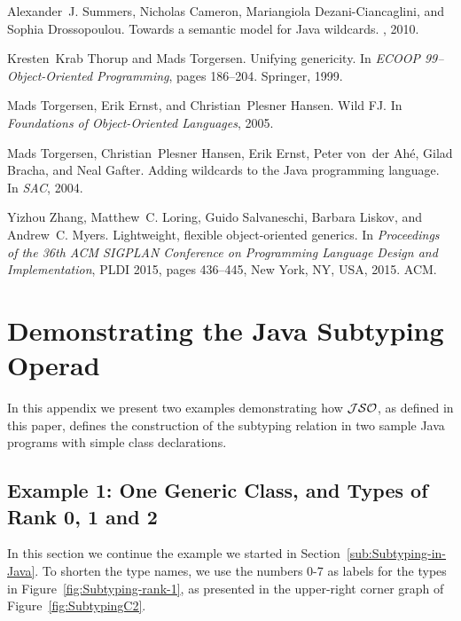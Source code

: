 \documentclass[twocolumn,english]{article}
\numberwithin{equation}{section}
\numberwithin{figure}{section}
\begin{document}
\begin{thebibliography}{10}
	Alexander~J. Summers, Nicholas Cameron, Mariangiola Dezani-Ciancaglini, and
	Sophia Drossopoulou.
	\newblock Towards a semantic model for {J}ava wildcards.
	, 2010.
	
	Kresten~Krab Thorup and Mads Torgersen.
	\newblock Unifying genericity.
	\newblock In {\em ECOOP 99--Object-Oriented Programming}, pages 186--204.
	Springer, 1999.
	
	Mads Torgersen, Erik Ernst, and Christian~Plesner Hansen.
	\newblock Wild {FJ}.
	\newblock In {\em Foundations of Object-Oriented Languages}, 2005.
	
	Mads Torgersen, Christian~Plesner Hansen, Erik Ernst, Peter von~der Ah\'e,
	Gilad Bracha, and Neal Gafter.
	\newblock Adding wildcards to the {J}ava programming language.
	\newblock In {\em SAC}, 2004.
	
	Yizhou Zhang, Matthew~C. Loring, Guido Salvaneschi, Barbara Liskov, and
	Andrew~C. Myers.
	\newblock Lightweight, flexible object-oriented generics.
	\newblock In {\em Proceedings of the 36th ACM SIGPLAN Conference on Programming
		Language Design and Implementation}, PLDI 2015, pages 436--445, New York, NY,
	USA, 2015. ACM.
	
\end{thebibliography}


\appendix

\section{\label{sec:Demonstration-of-JSO}Demonstrating the Java Subtyping
Operad}



In this appendix we present two examples demonstrating how $\mathcal{JSO}$,
as defined in this paper, defines the construction of the subtyping
relation in two sample Java programs with simple class declarations.


\subsection{Example 1: One Generic Class, and Types of Rank 0, 1 and 2}

In this section we continue the example we started in Section~\ref{sub:Subtyping-in-Java}.
To shorten the type names, we use the numbers 0-7 as labels for the
types in Figure~\ref{fig:Subtyping-rank-1}, as presented in the
upper-right corner graph of Figure~\ref{fig:SubtypingC2}.
\end{document}
